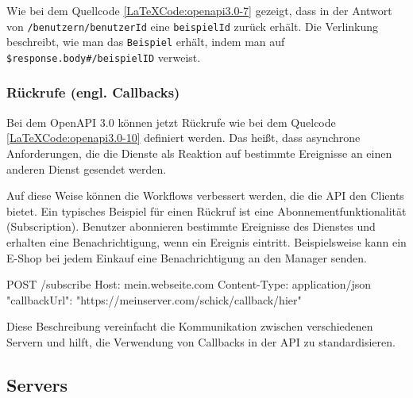 \begin{LaTeXCode}[caption={Open API 3.0 - Verlinkungen},captionpos=b, label=LaTeXCode:openapi3.0-7][numbers=none]
{
	"paths": {
		"/benutzern/{benutzerId}": {
			"get": {
				"responses": {
					"200": {
						"links": {
							"address": {
								"operationId": "gibBeispielMitID"
							}
						},
						"parameters": {
							"exampleId": "\\\$response.body#/beispielID"
						}
...
\end{LaTeXCode}

Wie bei dem Quellcode \ref{LaTeXCode:openapi3.0-7} gezeigt, dass in der Antwort von \texttt{/benutzern/{benutzerId}} eine \texttt{beispielId} zurück erhält. Die Verlinkung beschreibt, wie man das \texttt{Beispiel} erhält, indem man auf \texttt{\$response.body\#/beispielID} verweist.

\subsubsection{Rückrufe (engl. Callbacks)}

Bei dem OpenAPI 3.0 können jetzt Rückrufe wie bei dem Quelcode \ref{LaTeXCode:openapi3.0-10} definiert werden. Das heißt, dass asynchrone Anforderungen, die die Dienste als Reaktion auf bestimmte Ereignisse an einen anderen Dienst gesendet werden. 

Auf diese Weise können die Workflows verbessert werden, die die API den Clients bietet. Ein typisches Beispiel für einen Rückruf ist eine Abonnementfunktionalität (Subscription). Benutzer abonnieren bestimmte Ereignisse des Dienstes und erhalten eine Benachrichtigung, wenn ein Ereignis eintritt. Beispielsweise kann ein E-Shop bei jedem Einkauf eine Benachrichtigung an den Manager senden\cite{openapicallbacks17}.

\begin{LaTeXCode}[caption={Open API 3.0 - Callbacks\cite{openapicallbacks17}},captionpos=b, label=LaTeXCode:openapi3.0-10][numbers=none]
POST /subscribe
Host: mein.webseite.com
Content-Type: application/json
{
	"callbackUrl": "https://meinserver.com/schick/callback/hier"
}
\end{LaTeXCode}

Diese Beschreibung vereinfacht die Kommunikation zwischen verschiedenen Servern und hilft, die Verwendung von Callbacks in der API zu standardisieren.

\subsection{Servers}

